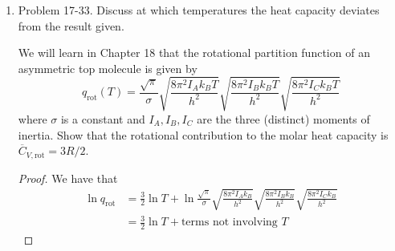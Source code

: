 \documentclass[../psets.tex]{subfiles}
\begin{document}
\begin{enumerate}
\begin{proof}
\begin{align*}
            &= \frac{T}{\Theta_\text{rot}}\left\{ 1+\frac{1}{3}\left( \frac{\Theta_\text{rot}}{T} \right)+\frac{1}{15}\left( \frac{\Theta_\text{rot}}{T} \right)^2+O\left[ \left( \frac{\Theta_\text{rot}}{T} \right)^3 \right] \right\}
        \end{align*}
        Now since our approximation for $q_\text{rot}(T)$ by an integral yields $T/\Theta_\text{rot}$ as a result, we know that the correction factor to second order is
        \begin{equation*}
            \text{correction factor} = \frac{1}{3}\left( \frac{\Theta_\text{rot}}{T} \right)+\frac{1}{15}\left( \frac{\Theta_\text{rot}}{T} \right)^2
        \end{equation*}
        Therefore, for  ($\Theta_\text{rot}=\SI{2.88}{\kelvin}$) at $T=\SI{300}{\kelvin}$, we have that
        \begin{equation*}
            \boxed{\text{correction factor} = \SI{0.321}{\percent}}
        \end{equation*}
        while for  ($\Theta_\text{rot}=\SI{85.3}{\kelvin}$) at $T=\SI{300}{\kelvin}$, we have that
        \begin{equation*}
            \boxed{\text{correction factor} = \SI{10.0}{\percent}}
        \end{equation*}
    \end{proof}
    \item Problem 17-33. Discuss at which temperatures the heat capacity deviates from the result given.\par
    We will learn in Chapter 18 that the rotational partition function of an asymmetric top molecule is given by
    \begin{equation*}
        q_\text{rot}(T) = \frac{\sqrt{\pi}}{\sigma}\sqrt{\frac{8\pi^2I_Ak_BT}{h^2}}\sqrt{\frac{8\pi^2I_Bk_BT}{h^2}}\sqrt{\frac{8\pi^2I_Ck_BT}{h^2}}
    \end{equation*}
    where $\sigma$ is a constant and $I_A,I_B,I_C$ are the three (distinct) moments of inertia. Show that the rotational contribution to the molar heat capacity is $\overline{C}_{V,\text{rot}}=3R/2$.
    \begin{proof}
        We have that
        \begin{align*}
            \ln q_\text{rot} &= \frac{3}{2}\ln T+\ln\frac{\sqrt{\pi}}{\sigma}\sqrt{\frac{8\pi^2I_Ak_B}{h^2}}\sqrt{\frac{8\pi^2I_Bk_B}{h^2}}\sqrt{\frac{8\pi^2I_Ck_B}{h^2}}\\
            &= \frac{3}{2}\ln T+\text{terms not involving }T
        \end{align*}

\end{proof}
\end{enumerate}
\end{document}
